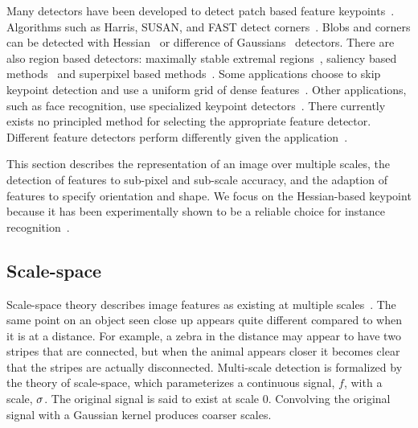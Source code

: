     Many detectors have been developed to detect patch based feature
      keypoints~\cite{mikolajczyk_comparison_2005,
      tuytelaars_local_2007}.
    Algorithms such as Harris, SUSAN, and FAST detect
      corners~\cite{harris_combined_1988, mikolajczyk_indexing_2001,
      smith_susannew_1997, rosten_machine_2006}.
    Blobs and corners can be detected with
      Hessian~\cite{beaudet_rotationally_1978,
      lindeberg_shapeadapted_1994} or difference of
      Gaussians~\cite{gaussier_neural_1992, lowe_distinctive_2004}
      detectors.
    There are also region based detectors:
    maximally stable extremal regions~\cite{matas_robust_2004},
      saliency based methods~\cite{buoncompagni_saliencybased_2015} and
      superpixel based methods~\cite{ren_learning_2003,
      mori_recovering_2004}.
    Some applications choose to skip keypoint detection and use a
      uniform grid of dense features~\cite{liu_sift_2008,
      revaud_deep_2015, iscen_comparison_2015}.
    Other applications, such as face recognition, use specialized
      keypoint detectors~\cite{dantone_realtime_2012,
      berg_tomvspete_2012}.
    There currently exists no principled method for selecting the
      appropriate feature detector.
    Different feature detectors perform differently given the
      application~\cite{tuytelaars_local_2007}.

    This section describes the representation of an image over multiple
      scales, the detection of features to sub-pixel and sub-scale
      accuracy, and the adaption of features to specify orientation and
      shape.
    We focus on the Hessian-based keypoint because it has been
      experimentally shown to be a reliable choice for instance
      recognition~\cite{tuytelaars_local_2007}.

   \subsection{Scale-space}
        Scale-space theory describes image features as existing at
          multiple scales~\cite{lindeberg_scalespace_1993}.
        The same point on an object seen close up appears quite
          different compared to when it is at a distance.
        For example, a zebra in the distance may appear to have two
          stripes that are connected, but when the animal appears closer
          it becomes clear that the stripes are actually disconnected.
        Multi-scale detection is formalized by the theory of
          scale-space, which parameterizes a continuous signal, $f$, with
          a scale, $\sigma$.
        The original signal is said to exist at scale $0$.
        Convolving the original signal with a Gaussian kernel produces
          coarser scales.

